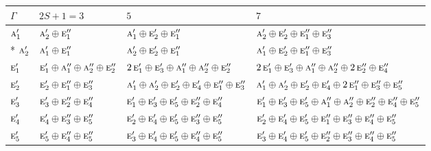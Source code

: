 \documentclass[10pt,a4paper]{article}
\numberwithin{equation}{section}
\newcommand{\irr}[1]{\text{\normalfont\scshape #1}}
\begin{document}
{\small\setlength{\tabcolsep}{3pt}\begin{longtable}{@{}l>{\RaggedRight\arraybackslash}p{}>{\RaggedRight\arraybackslash}p{}>{\RaggedRight\arraybackslash}p{}@{}}\toprule
$\Gamma$ & $2S + 1 = 3$ & $5$ & $7$\\\midrule\endhead
\bottomrule\endfoot\endlastfoot
$\irr{a}_{1}'$ & $\irr{a}_{2}'\oplus \irr{e}_{1}''$ & $\irr{a}_{1}'\oplus \irr{e}_{2}'\oplus \irr{e}_{1}''$ & $\irr{a}_{2}'\oplus \irr{e}_{2}'\oplus \irr{e}_{1}''\oplus \irr{e}_{3}''$\\*
$\irr{a}_{2}'$ & $\irr{a}_{1}'\oplus \irr{e}_{1}''$ & $\irr{a}_{2}'\oplus \irr{e}_{2}'\oplus \irr{e}_{1}''$ & $\irr{a}_{1}'\oplus \irr{e}_{2}'\oplus \irr{e}_{1}''\oplus \irr{e}_{3}''$\\
$\irr{e}_{1}'$ & $\irr{e}_{1}'\oplus \irr{a}_{1}''\oplus \irr{a}_{2}''\oplus \irr{e}_{2}''$ & $2\,\irr{e}_{1}'\oplus \irr{e}_{3}'\oplus \irr{a}_{1}''\oplus \irr{a}_{2}''\oplus \irr{e}_{2}''$ & $2\,\irr{e}_{1}'\oplus \irr{e}_{3}'\oplus \irr{a}_{1}''\oplus \irr{a}_{2}''\oplus 2\,\irr{e}_{2}''\oplus \irr{e}_{4}''$\\
$\irr{e}_{2}'$ & $\irr{e}_{2}'\oplus \irr{e}_{1}''\oplus \irr{e}_{3}''$ & $\irr{a}_{1}'\oplus \irr{a}_{2}'\oplus \irr{e}_{2}'\oplus \irr{e}_{4}'\oplus \irr{e}_{1}''\oplus \irr{e}_{3}''$ & $\irr{a}_{1}'\oplus \irr{a}_{2}'\oplus \irr{e}_{2}'\oplus \irr{e}_{4}'\oplus 2\,\irr{e}_{1}''\oplus \irr{e}_{3}''\oplus \irr{e}_{5}''$\\
$\irr{e}_{3}'$ & $\irr{e}_{3}'\oplus \irr{e}_{2}''\oplus \irr{e}_{4}''$ & $\irr{e}_{1}'\oplus \irr{e}_{3}'\oplus \irr{e}_{5}'\oplus \irr{e}_{2}''\oplus \irr{e}_{4}''$ & $\irr{e}_{1}'\oplus \irr{e}_{3}'\oplus \irr{e}_{5}'\oplus \irr{a}_{1}''\oplus \irr{a}_{2}''\oplus \irr{e}_{2}''\oplus \irr{e}_{4}''\oplus \irr{e}_{5}''$\\
$\irr{e}_{4}'$ & $\irr{e}_{4}'\oplus \irr{e}_{3}''\oplus \irr{e}_{5}''$ & $\irr{e}_{2}'\oplus \irr{e}_{4}'\oplus \irr{e}_{5}'\oplus \irr{e}_{3}''\oplus \irr{e}_{5}''$ & $\irr{e}_{2}'\oplus \irr{e}_{4}'\oplus \irr{e}_{5}'\oplus \irr{e}_{1}''\oplus \irr{e}_{3}''\oplus \irr{e}_{4}''\oplus \irr{e}_{5}''$\\
$\irr{e}_{5}'$ & $\irr{e}_{5}'\oplus \irr{e}_{4}''\oplus \irr{e}_{5}''$ & $\irr{e}_{3}'\oplus \irr{e}_{4}'\oplus \irr{e}_{5}'\oplus \irr{e}_{4}''\oplus \irr{e}_{5}''$ & $\irr{e}_{3}'\oplus \irr{e}_{4}'\oplus \irr{e}_{5}'\oplus \irr{e}_{2}''\oplus \irr{e}_{3}''\oplus \irr{e}_{4}''\oplus \irr{e}_{5}''$\\

\end{longtable}}
\end{document}
